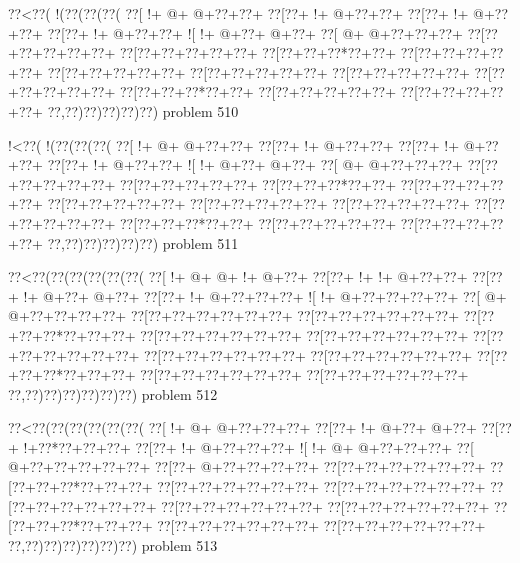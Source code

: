 \vbox{\vbox{\goo
\0??<\0??(\- !(\0??(\0??(\0??(
\0??[\- !+\- @+\- @+\0??+\0??+
\0??[\0??+\- !+\- @+\0??+\0??+
\0??[\0??+\- !+\- @+\0??+\0??+
\0??[\0??+\- !+\- @+\0??+\0??+
\- ![\- !+\- @+\0??+\- @+\0??+
\0??[\- @+\- @+\0??+\0??+\0??+
\0??[\0??+\0??+\0??+\0??+\0??+
\0??[\0??+\0??+\0??+\0??+\0??+
\0??[\0??+\0??+\0??*\0??+\0??+
\0??[\0??+\0??+\0??+\0??+\0??+
\0??[\0??+\0??+\0??+\0??+\0??+
\0??[\0??+\0??+\0??+\0??+\0??+
\0??[\0??+\0??+\0??+\0??+\0??+
\0??[\0??+\0??+\0??+\0??+\0??+
\0??[\0??+\0??+\0??*\0??+\0??+
\0??[\0??+\0??+\0??+\0??+\0??+
\0??[\0??+\0??+\0??+\0??+\0??+
\0??,\0??)\0??)\0??)\0??)\0??)
}
\hfil problem 510\hfil\break
}

\vbox{\vbox{\goo
\- !<\0??(\- !(\0??(\0??(\0??(
\0??[\- !+\- @+\- @+\0??+\0??+
\0??[\0??+\- !+\- @+\0??+\0??+
\0??[\0??+\- !+\- @+\0??+\0??+
\0??[\0??+\- !+\- @+\0??+\0??+
\- ![\- !+\- @+\0??+\- @+\0??+
\0??[\- @+\- @+\0??+\0??+\0??+
\0??[\0??+\0??+\0??+\0??+\0??+
\0??[\0??+\0??+\0??+\0??+\0??+
\0??[\0??+\0??+\0??*\0??+\0??+
\0??[\0??+\0??+\0??+\0??+\0??+
\0??[\0??+\0??+\0??+\0??+\0??+
\0??[\0??+\0??+\0??+\0??+\0??+
\0??[\0??+\0??+\0??+\0??+\0??+
\0??[\0??+\0??+\0??+\0??+\0??+
\0??[\0??+\0??+\0??*\0??+\0??+
\0??[\0??+\0??+\0??+\0??+\0??+
\0??[\0??+\0??+\0??+\0??+\0??+
\0??,\0??)\0??)\0??)\0??)\0??)
}
\hfil problem 511\hfil\break
}

\vbox{\vbox{\goo
\0??<\0??(\0??(\0??(\0??(\0??(\0??(
\0??[\- !+\- @+\- @+\- !+\- @+\0??+
\0??[\0??+\- !+\- !+\- @+\0??+\0??+
\0??[\0??+\- !+\- @+\0??+\- @+\0??+
\0??[\0??+\- !+\- @+\0??+\0??+\0??+
\- ![\- !+\- @+\0??+\0??+\0??+\0??+
\0??[\- @+\- @+\0??+\0??+\0??+\0??+
\0??[\0??+\0??+\0??+\0??+\0??+\0??+
\0??[\0??+\0??+\0??+\0??+\0??+\0??+
\0??[\0??+\0??+\0??*\0??+\0??+\0??+
\0??[\0??+\0??+\0??+\0??+\0??+\0??+
\0??[\0??+\0??+\0??+\0??+\0??+\0??+
\0??[\0??+\0??+\0??+\0??+\0??+\0??+
\0??[\0??+\0??+\0??+\0??+\0??+\0??+
\0??[\0??+\0??+\0??+\0??+\0??+\0??+
\0??[\0??+\0??+\0??*\0??+\0??+\0??+
\0??[\0??+\0??+\0??+\0??+\0??+\0??+
\0??[\0??+\0??+\0??+\0??+\0??+\0??+
\0??,\0??)\0??)\0??)\0??)\0??)\0??)
}
\hfil problem 512\hfil\break
}

\vbox{\vbox{\goo
\0??<\0??(\0??(\0??(\0??(\0??(\0??(
\0??[\- !+\- @+\- @+\0??+\0??+\0??+
\0??[\0??+\- !+\- @+\0??+\- @+\0??+
\0??[\0??+\- !+\0??*\0??+\0??+\0??+
\0??[\0??+\- !+\- @+\0??+\0??+\0??+
\- ![\- !+\- @+\- @+\0??+\0??+\0??+
\0??[\- @+\0??+\0??+\0??+\0??+\0??+
\0??[\0??+\- @+\0??+\0??+\0??+\0??+
\0??[\0??+\0??+\0??+\0??+\0??+\0??+
\0??[\0??+\0??+\0??*\0??+\0??+\0??+
\0??[\0??+\0??+\0??+\0??+\0??+\0??+
\0??[\0??+\0??+\0??+\0??+\0??+\0??+
\0??[\0??+\0??+\0??+\0??+\0??+\0??+
\0??[\0??+\0??+\0??+\0??+\0??+\0??+
\0??[\0??+\0??+\0??+\0??+\0??+\0??+
\0??[\0??+\0??+\0??*\0??+\0??+\0??+
\0??[\0??+\0??+\0??+\0??+\0??+\0??+
\0??[\0??+\0??+\0??+\0??+\0??+\0??+
\0??,\0??)\0??)\0??)\0??)\0??)\0??)
}
\hfil problem 513\hfil\break
}

